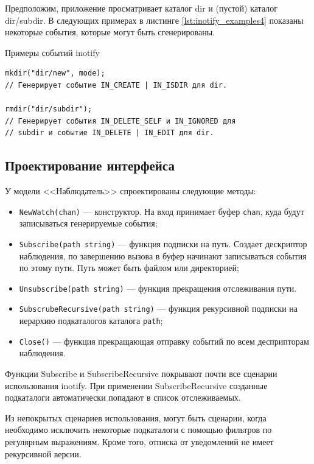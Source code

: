 \documentclass[14pt, russian]{scrartcl}
\newcommand{\code}[1]{\texttt{#1}}
\begin{document}
Предположим, приложение просматривает каталог dir и (пустой) каталог dir/subdir.
В следующих примерах в листинге \ref{lst:inotify_examples4} показаны некоторые события, которые могут быть
сгенерированы.

\begin{listing}[H]
\caption{Примеры событий inotify}
\label{lst:inotify_examples4}
\begin{verbatim}
mkdir("dir/new", mode);
// Генерирует событие IN_CREATE | IN_ISDIR для dir.

rmdir("dir/subdir");
// Генерирует события IN_DELETE_SELF и IN_IGNORED для
// subdir и событие IN_DELETE | IN_EDIT для dir.
\end{verbatim}
\end{listing}

\subsection{Проектирование интерфейса}

У модели <<Наблюдатель>> спроектированы следующие методы:

\begin{itemize}
  \item \code{NewWatch(chan)} --- конструктор. На вход принимает буфер
        \code{chan}, куда будут записываться генерируемые события;
  \item \code{Subscribe(path string)} --- функция подписки на путь. Создает
        дескриптор наблюдения, по завершению вызова в буфер начинают
        записываться события по этому пути. Путь может быть файлом или
        директорией;
  \item \code{Unsubscribe(path string)} --- функция прекращения отслеживания пути.
  \item \code{SubscrubeRecursive(path string)} --- функция рекурсивной подписки
        на иерархию подкаталогов каталога \code{path};
  \item \code{Close()} --- функция прекращающая отправку событий по всем
        десприпторам наблюдения.
\end{itemize}

Функции Subscribe и SubscribeRecursive покрывают почти все сценарии использования
inotify. При применении SubscribeRecursive созданные подкаталоги автоматически
попадают в список отслеживаемых.

Из непокрытых сценариев использования, могут быть сценарии, когда необходимо
исключить некоторые подкаталоги с помощью фильтров по регулярным выражениям.
Кроме того, отписка от уведомлений не имеет рекурсивной версии.
\end{document}

